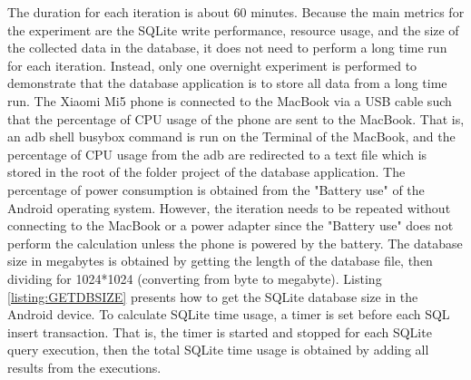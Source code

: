 The duration for each iteration is about 60 minutes. Because the main metrics for the experiment are the SQLite write performance, resource usage, and the size of the collected data in the database, it does not need to perform a long time run for each iteration. Instead, only one overnight experiment is performed to demonstrate that the database application is to store all data from a long time run. The Xiaomi Mi5 phone is connected to the MacBook via a USB cable such that the percentage of CPU usage of the phone are sent to the MacBook. That is, an adb shell busybox command is run on the Terminal of the MacBook, and the percentage of CPU usage from the adb are redirected to a text file which is stored in the root of the folder project of the database application. The percentage of power consumption is obtained from the "Battery use" of the Android operating system. However, the iteration needs to be repeated without connecting to the MacBook or a power adapter since the "Battery use" does not perform the calculation unless the phone is powered by the battery. The database size in megabytes is obtained by getting the length of the database file, then dividing for 1024*1024 (converting from byte to megabyte). Listing \ref{listing:GETDBSIZE} presents how to get the SQLite database size in the Android device. To calculate SQLite time usage, a timer is set before each SQL insert transaction. That is, the timer is started and stopped for each SQLite query execution, then the total SQLite time usage is obtained by adding all results from the executions.
